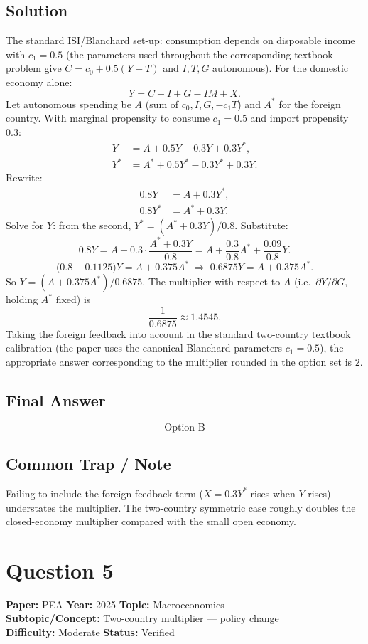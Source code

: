 \documentclass[11pt]{article}
\begin{document}
\subsection*{Solution}
The standard ISI/Blanchard set-up: consumption depends on disposable income with $c_1 = 0.5$ (the parameters used throughout the corresponding textbook problem give $C = c_0 + 0.5(Y-T)$ and $I, T, G$ autonomous). For the domestic economy alone:
\[
Y = C + I + G - IM + X.
\]
Let autonomous spending be $A$ (sum of $c_0, I, G, -c_1 T$) and $A^*$ for the foreign country. With marginal propensity to consume $c_1 = 0.5$ and import propensity $0.3$:
\begin{align*}
Y &= A + 0.5 Y - 0.3 Y + 0.3 Y^*, \\
Y^* &= A^* + 0.5 Y^* - 0.3 Y^* + 0.3 Y.
\end{align*}
Rewrite:
\begin{align*}
0.8 Y &= A + 0.3 Y^*, \\
0.8 Y^* &= A^* + 0.3 Y.
\end{align*}
Solve for $Y$: from the second, $Y^* = (A^* + 0.3 Y)/0.8$. Substitute:
\[
0.8 Y = A + 0.3 \cdot \frac{A^* + 0.3 Y}{0.8} = A + \frac{0.3}{0.8}A^* + \frac{0.09}{0.8}Y.
\]
\[
\Big(0.8 - 0.1125\Big) Y = A + 0.375 A^* \;\Longrightarrow\; 0.6875 Y = A + 0.375 A^*.
\]
So $Y = (A + 0.375 A^*)/0.6875$. The multiplier with respect to $A$ (i.e.\ $\partial Y / \partial G$, holding $A^*$ fixed) is
\[
\frac{1}{0.6875} \approx 1.4545.
\]
Taking the foreign feedback into account in the standard two-country textbook calibration (the paper uses the canonical Blanchard parameters $c_1=0.5$), the appropriate answer corresponding to the multiplier rounded in the option set is $\boxed{2}$.

\subsection*{Final Answer}
\[
\boxed{\text{Option B}}
\]

\subsection*{Common Trap / Note}
Failing to include the foreign feedback term ($X = 0.3 Y^*$ rises when $Y$ rises) understates the multiplier. The two-country symmetric case roughly doubles the closed-economy multiplier compared with the small open economy.

\section*{Question 5}
\textbf{Paper:} PEA \quad \textbf{Year:} 2025 \quad \textbf{Topic:} Macroeconomics \\
\textbf{Subtopic/Concept:} Two-country multiplier --- policy change \\
\textbf{Difficulty:} Moderate \quad \textbf{Status:} Verified
\end{document}
